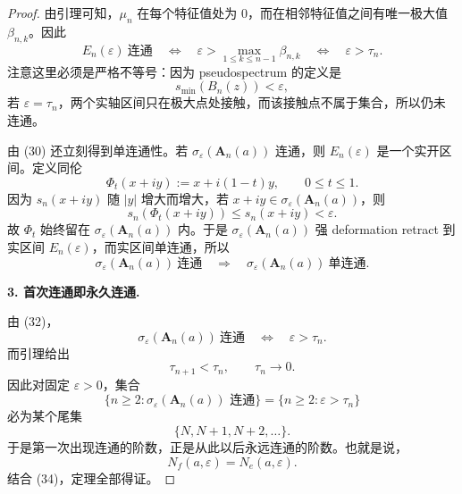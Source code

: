 \documentclass[11pt]{ctexart}
\newcommand{\eps}{\varepsilon}
\newcommand{\A}{\mathbf A}
\begin{document}
\begin{proof}
由引理可知，\(\mu_n\) 在每个特征值处为 \(0\)，而在相邻特征值之间有唯一极大值 \(\beta_{n,k}\)。因此
\[
E_n(\eps)\ \text{连通}
\quad\Longleftrightarrow\quad
\eps>\max_{1\le k\le n-1}\beta_{n,k}
\quad\Longleftrightarrow\quad
\eps>\tau_n.
\tag{32}
\]
注意这里必须是严格不等号：因为 pseudospectrum 的定义是
\[
s_{\min}(B_n(z))<\eps,
\]
若 \(\eps=\tau_n\)，两个实轴区间只在极大点处接触，而该接触点不属于集合，所以仍未连通。

由 (30) 还立刻得到单连通性。若 \(\sigma_\eps(\A_n(a))\) 连通，则 \(E_n(\eps)\) 是一个实开区间。定义同伦
\[
\Phi_t(x+iy):=x+i(1-t)y,\qquad 0\le t\le1.
\tag{33}
\]
因为 \(s_n(x+iy)\) 随 \(|y|\) 增大而增大，若 \(x+iy\in\sigma_\eps(\A_n(a))\)，则
\[
s_n(\Phi_t(x+iy))\le s_n(x+iy)<\eps.
\]
故 \(\Phi_t\) 始终留在 \(\sigma_\eps(\A_n(a))\) 内。于是 \(\sigma_\eps(\A_n(a))\) 强 deformation retract 到实区间 \(E_n(\eps)\)，而实区间单连通，所以
\[
\sigma_\eps(\A_n(a))\ \text{连通}
\quad\Longrightarrow\quad
\sigma_\eps(\A_n(a))\ \text{单连通}.
\tag{34}
\]

\medskip

\noindent\textbf{3. 首次连通即永久连通.}

由 (32)，
\[
\sigma_\eps(\A_n(a))\ \text{连通}
\quad\Longleftrightarrow\quad
\eps>\tau_n.
\tag{35}
\]
而引理给出
\[
\tau_{n+1}<\tau_n,\qquad \tau_n\to0.
\tag{36}
\]
因此对固定 \(\eps>0\)，集合
\[
\{n\ge2:\sigma_\eps(\A_n(a))\text{ 连通}\}
=
\{n\ge2:\eps>\tau_n\}
\tag{37}
\]
必为某个尾集
\[
\{N,N+1,N+2,\dots\}.
\tag{38}
\]
于是第一次出现连通的阶数，正是从此以后永远连通的阶数。也就是说，
\[
N_f(a,\eps)=N_e(a,\eps).
\tag{39}
\]
结合 (34)，定理全部得证。
\end{proof}
\end{document}
